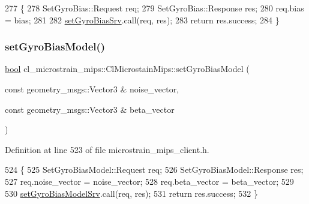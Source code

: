 \begin{DoxyCode}
277     \{
278         SetGyroBias::Request req;
279         SetGyroBias::Response res;
280         req.bias = bias;
281 
282         \hyperlink{classcl__microstrain__mips_1_1ClMicrostainMips_a29fcea0897ca3bd7a036ab5c1856b86c}{setGyroBiasSrv}.call(req, res);
283         \textcolor{keywordflow}{return} res.success;
284     \}
\end{DoxyCode}
\mbox{\label{classcl__microstrain__mips_1_1ClMicrostainMips_ac0a42062a2938fca9c982668909f7bff}} 
\subsubsection{\texorpdfstring{set\+Gyro\+Bias\+Model()}{setGyroBiasModel()}}
{\footnotesize\ttfamily \hyperlink{classbool}{bool} cl\+\_\+microstrain\+\_\+mips\+::\+Cl\+Microstain\+Mips\+::set\+Gyro\+Bias\+Model (\begin{DoxyParamCaption}\item[{const geometry\+\_\+msgs\+::\+Vector3 \&}]{noise\+\_\+vector,  }\item[{const geometry\+\_\+msgs\+::\+Vector3 \&}]{beta\+\_\+vector }\end{DoxyParamCaption})\hspace{0.3cm}{\ttfamily [inline]}}



Definition at line 523 of file microstrain\+\_\+mips\+\_\+client.\+h.


\begin{DoxyCode}
524     \{
525         SetGyroBiasModel::Request req;
526         SetGyroBiasModel::Response res;
527         req.noise\_vector = noise\_vector;
528         req.beta\_vector = beta\_vector;
529 
530         \hyperlink{classcl__microstrain__mips_1_1ClMicrostainMips_a96fa3777b87a5d8abcb0f5fe6d740934}{setGyroBiasModelSrv}.call(req, res);
531         \textcolor{keywordflow}{return} res.success;
532     \}
\end{DoxyCode}
\mbox{\label{classcl__microstrain__mips_1_1ClMicrostainMips_a26f7969c967cc7f83f556f566254e0ff}} 
